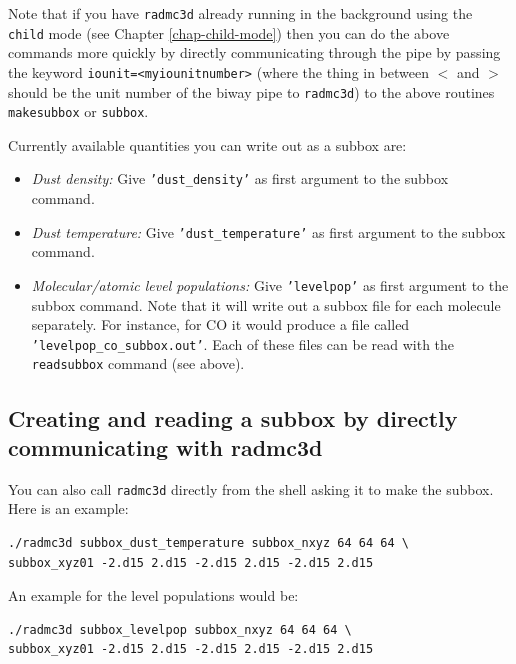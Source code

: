 \documentclass{report}
\newenvironment{asciibox}%
  {\begin{list}{}{%
    \setlength{\topsep}{0.5em}%
    \setlength{\parskip}{0em}%
    \setlength{\parsep}{0em}%
    \setlength{\itemsep}{0em}%
    \setlength{\rightmargin}{0em}%
    \setlength{\leftmargin}{3.0em}%
    \setlength{\labelsep}{1em}%
    \setlength{\labelwidth}{2em}%
  }\normalfont\footnotesize\item}
  {\end{list}}
\begin{document}
Note that if you have {\small\tt radmc3d} already running in the background
using the {\small\tt child} mode (see Chapter \ref{chap-child-mode}) then
you can do the above commands more quickly by directly communicating through
the pipe by passing the keyword {\small\tt iounit=<myiounitnumber>} (where
the thing in between $<$ and $>$ should be the unit number of the biway pipe
to {\small\tt radmc3d}) to the above routines {\small\tt makesubbox} or
{\small\tt subbox}.

Currently available quantities you can write out as a subbox are:
\begin{itemize}
\item {\em Dust density:} Give {\small\tt 'dust\_density'} as first argument to
the subbox command.
\item {\em Dust temperature:} Give {\small\tt 'dust\_temperature'} as first argument to
the subbox command.
\item {\em Molecular/atomic level populations:} Give {\small\tt 'levelpop'}
  as first argument to the subbox command. Note that it will write out a subbox
  file for each molecule separately. For instance, for CO it would produce
  a file called {\small\tt 'levelpop\_co\_subbox.out'}. Each of these files can
  be read with the {\small\tt readsubbox} command (see above).
\end{itemize}

\subsection{Creating and reading a subbox by directly communicating with radmc3d}
You can also call {\small\tt radmc3d} directly from the shell asking it to make
the subbox. Here is an example:
\begin{asciibox}\begin{verbatim}
./radmc3d subbox_dust_temperature subbox_nxyz 64 64 64 \
subbox_xyz01 -2.d15 2.d15 -2.d15 2.d15 -2.d15 2.d15
\end{verbatim}\end{asciibox}
An example for the level populations would be:
\begin{asciibox}\begin{verbatim}
./radmc3d subbox_levelpop subbox_nxyz 64 64 64 \
subbox_xyz01 -2.d15 2.d15 -2.d15 2.d15 -2.d15 2.d15
\end{verbatim}\end{asciibox}
\end{document}
